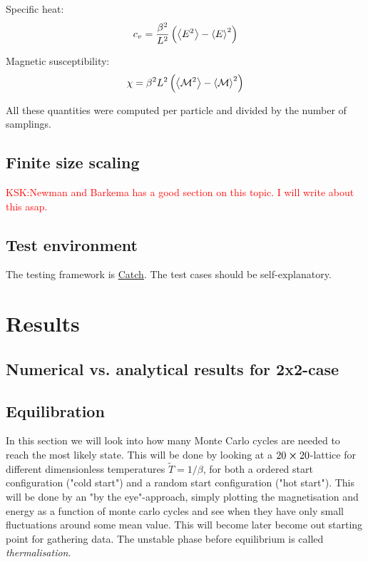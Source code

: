\documentclass[11pt,a4paper,english]{article}
\numberwithin{equation}{section}
\newcommand{\magM}{\mathcal{M}}
\begin{document}
Specific heat:
\begin{equation}
c_v = \frac{\beta^2}{L^2}\left(\expval{E^2} - \expval{E}^2\right)
\end{equation}

Magnetic susceptibility:
\begin{equation}
\chi = \beta^2 L^2 \left(\expval{\magM^2} - \expval{\magM}^2\right)
\end{equation}

All these quantities were computed per particle and divided by the number 
of samplings.

\subsection{Finite size scaling}
\textcolor{red}{KSK:Newman and Barkema has a good section on this topic. I will write about this asap.} 

\subsection{Test environment}

The testing framework is \href{https://github.com/philsquared/Catch}{Catch}.
The test cases should be self-explanatory.


\section{Results}

\subsection{Numerical vs. analytical results for 2x2-case}

\subsection{Equilibration}
In this section we will look into how many Monte Carlo cycles are needed 
to reach the most likely state. This will be done by looking at a 
$20 \cross 20$-lattice for different dimensionless temperatures 
$\tilde{T}=1/\beta$, for both a ordered start configuration ("cold start") 
and a random start configuration ("hot start"). 
This will be done by an "by the eye"-approach, simply plotting the 
magnetisation and energy as a function of monte carlo cycles and see 
when they have only small fluctuations around some mean value. This will 
become later become out starting point for gathering data. The unstable 
phase before equilibrium is called \emph{thermalisation}.
\end{document}
